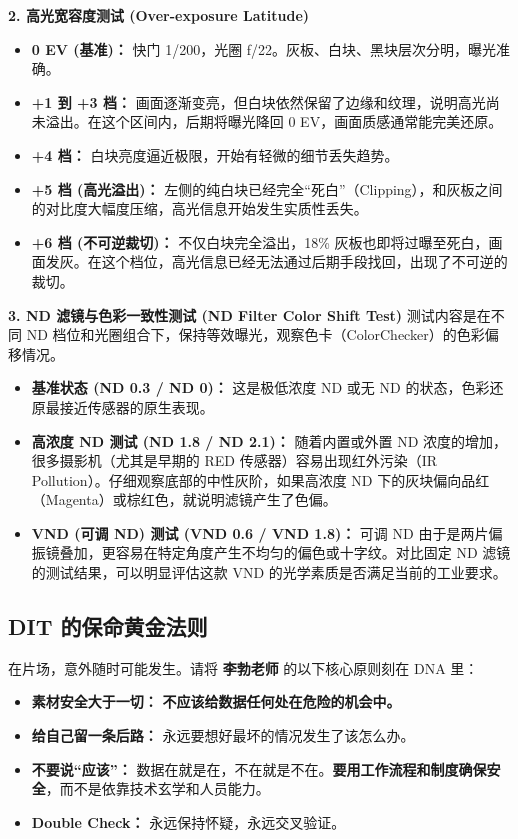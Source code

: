 \documentclass[10pt, a5paper]{article}
\newcommand{\libo}{\textbf{\textcolor{DITBlue}{李勃老师}}}
\begin{document}
\textbf{2. 高光宽容度测试 (Over-exposure Latitude)}
\begin{itemize}
    \item \textbf{0 EV (基准)：} 快门 1/200，光圈 f/22。灰板、白块、黑块层次分明，曝光准确。
    \item \textbf{+1 到 +3 档：} 画面逐渐变亮，但白块依然保留了边缘和纹理，说明高光尚未溢出。在这个区间内，后期将曝光降回 0 EV，画面质感通常能完美还原。
    \item \textbf{+4 档：} 白块亮度逼近极限，开始有轻微的细节丢失趋势。
    \item \textcolor{AlertRed}{\textbf{+5 档 (高光溢出)：}} 左侧的纯白块已经完全“死白”（Clipping），和灰板之间的对比度大幅度压缩，高光信息开始发生实质性丢失。
    \item \textcolor{AlertRed}{\textbf{+6 档 (不可逆裁切)：}} 不仅白块完全溢出，18\% 灰板也即将过曝至死白，画面发灰。在这个档位，高光信息已经无法通过后期手段找回，出现了不可逆的裁切。
\end{itemize}

\textbf{3. ND 滤镜与色彩一致性测试 (ND Filter Color Shift Test)}
测试内容是在不同 ND 档位和光圈组合下，保持等效曝光，观察色卡（ColorChecker）的色彩偏移情况。
\begin{itemize}
    \item \textbf{基准状态 (ND 0.3 / ND 0)：} 这是极低浓度 ND 或无 ND 的状态，色彩还原最接近传感器的原生表现。
    \item \textbf{高浓度 ND 测试 (ND 1.8 / ND 2.1)：} 随着内置或外置 ND 浓度的增加，很多摄影机（尤其是早期的 RED 传感器）容易出现红外污染（IR Pollution）。仔细观察底部的中性灰阶，如果高浓度 ND 下的灰块偏向品红（Magenta）或棕红色，就说明滤镜产生了色偏。
    \item \textbf{VND (可调 ND) 测试 (VND 0.6 / VND 1.8)：} 可调 ND 由于是两片偏振镜叠加，更容易在特定角度产生不均匀的偏色或十字纹。对比固定 ND 滤镜的测试结果，可以明显评估这款 VND 的光学素质是否满足当前的工业要求。
\end{itemize}

\subsection{DIT 的保命黄金法则}

\begin{tcolorbox}[colback=white, colframe=AlertRed, boxrule=1pt, arc=1mm, title={\textbf{\faLock~ 来自李勃老师的绝对安全底线}}] 
\small
在片场，意外随时可能发生。请将 \libo{} 的以下核心原则刻在 DNA 里：
\begin{itemize}
    \item \textbf{素材安全大于一切：} \textbf{不应该给数据任何处在危险的机会中。}
    \item \textbf{给自己留一条后路：} 永远要想好最坏的情况发生了该怎么办。
    \item \textbf{不要说“应该”：} 数据在就是在，不在就是不在。\textbf{要用工作流程和制度确保安全}，而不是依靠技术玄学和人员能力。
    \item \textbf{Double Check：} 永远保持怀疑，永远交叉验证。
\end{itemize}
\end{tcolorbox}
\vspace{0.3cm}
\end{document}
